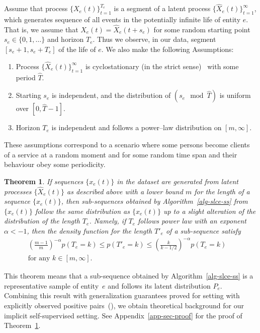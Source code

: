 \documentclass[sigconf]{acmart}
\newtheorem{thm}{Theorem}
\begin{document}
Assume that process $\{X_e(t)\}_{t=1}^{T_e}$ is a segment of a latent process $\{\widehat{X}_e(t)\}_{t=1}^{\infty}$, which generates sequence of all events in the potentially infinite life of entity $e$. That is, we assume that $X_e(t)=\widehat{X}_e(t+s_e)$ for some random starting point $s_e\in \{0,1,\ldots\}$ and horizon $T_e$. Thus we observe, in our data, segment $[s_e+1,s_e+T_e]$ of the life of $e$. We also make the following Assumptions:
\begin{enumerate}
    \item Process $\{\widehat{X}_e(t)\}_{t=1}^{\infty}$ is cyclostationary (in the strict sense)~\citep{Gardner2006Cyclostationarity} with some period $\widehat{T}$.
    \item Starting $s_e$ is independent, and the distribution of $(s_e \mod \widehat{T})$ is uniform over $[0,\widehat{T}-1]$.
    \item Horizon $T_e$ is independent and follows a power--law distribution on $[m,\infty]$.
\end{enumerate}
These assumptions correspond to a scenario where some persons become clients of a service at a random moment and for some random time span and their behaviour obey some periodicity.    %
\begin{thm}\label{thm:distribution}
If sequences $\{x_e(t)\}$ in the dataset are generated from latent processes $\{\widehat{X}_e(t)\}$ as described above with a lower bound $m$ for the length of a sequence $\{x_e(t)\}$, then sub-sequences obtained by Algorithm~\ref{alg-slce-ss} from $\{x_e(t)\}$ follow the same distribution as $\{x_e(t)\}$ up to a slight alteration of the distribution of the length $T_e$. Namely, if $T_e$ follows power law with an exponent $\alpha <-1$, then the density function for the length $T'_e$ of a sub-sequence satisfy 
\begin{multline}\label{probability_ratio}
    \left (\frac{m-1}{m}\right )^{-\alpha} p(T_e=k)\leq p(T'_e=k) \leq \left(\frac{k}{k-1/2}\right )^{-\alpha} p(T_e=k)  \quad \\ \mbox{for any } k\in [m,\infty].
\end{multline}
\end{thm}
This theorem means that a sub-sequence obtained by Algorithm~\ref{alg-slce-ss} is a representative sample of entity~$e$ and follows its latent distribution $P_e$. Combining this result with generalization guarantees proved for setting with explicitly observed positive pairs~(\cite{Saunshi2019ICML}), we obtain theoretical background for our implicit self-supervised setting.   
See Appendix~\ref{app-sec-proof} for the proof of Theorem~\ref{thm:distribution}.
\end{document}
